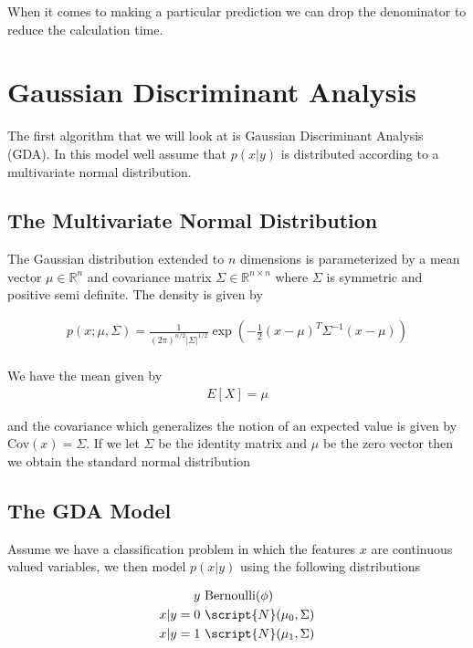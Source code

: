 \documentclass[11pt]{exam}
\begin{document}
When it comes to making a particular prediction we can drop the denominator to reduce the calculation time.

\section{Gaussian Discriminant Analysis}

The first algorithm that we will look at is Gaussian Discriminant Analysis (GDA). In this model well assume that $p(x|y)$ is distributed according to a multivariate normal distribution. 

\subsection{The Multivariate Normal Distribution}
The Gaussian distribution extended to $n$ dimensions is parameterized by a mean vector $\mu \in \mathbb{R}^n$ and covariance matrix $\Sigma \in \mathbb{R}^{n \times n}$ where $\Sigma$ is symmetric and positive semi definite. The density is given by

\begin{align*}
p(x;\mu,\Sigma) =  \frac{1}{(2\pi)^{n/2} |\Sigma|^{1/2}} \exp(-\frac{1}{2}(x - \mu)^T \Sigma^{-1}(x - \mu))\\
\end{align*}

We have the mean given by
\begin{align*}
E[X] = \mu
\end{align*}

and the covariance which generalizes the notion of an expected value is given by Cov$(x) = \Sigma$. If we let $\Sigma$ be the identity matrix and $\mu$ be the zero vector then we obtain the standard normal distribution

\subsection{The GDA Model}

Assume we have a classification problem in which the features $x$ are continuous valued variables, we then model $p(x|y)$ using the following distributions

\begin{align*}
y &~ \text{Bernoulli}(\phi)\\
x|y=0 &~ \script{N}(\mu_0,\Sigma)\\
x|y=1 &~ \script{N}(\mu_1,\Sigma)\\
\end{align*}
\end{document}
